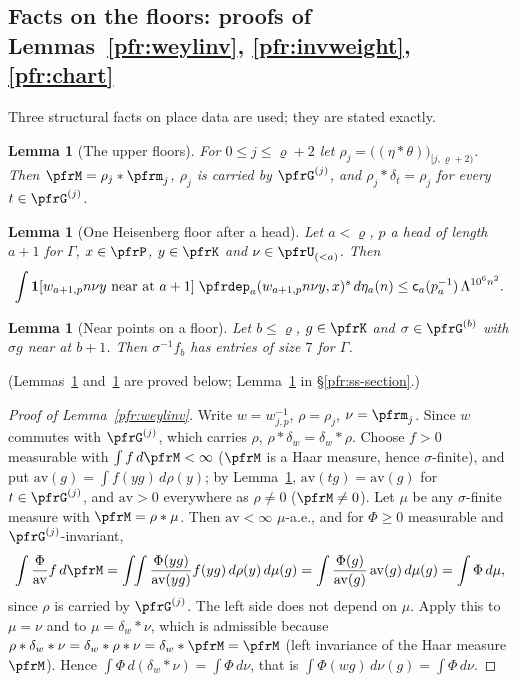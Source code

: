 \documentclass[10pt]{amsart}
\newtheorem{lemma}[theorem]{Lemma}
\theoremstyle{definition}
\theoremstyle{remark}
\begin{document}
\subsection{Facts on the floors: proofs of Lemmas~\ref{pfr:weylinv}, \ref{pfr:invweight}, \ref{pfr:chart}}\label{pfr:ss-floors}

Three structural facts on place data are used; they are stated exactly.

\begin{lemma}[The upper floors]\label{pfr:upperinv}
For $0\le j\le\varrho+2$ let $\rho_j=\bigl((\eta*\theta)\bigr)_{[j,\varrho+2)}$. Then $\pfrM=\rho_j*\pfrm_j$,
$\rho_j$ is carried by $\pfrG^{(j)}$, and $\rho_j*\delta_t=\rho_j$ for every $t\in\pfrG^{(j)}$.
\end{lemma}

\begin{lemma}[One Heisenberg floor after a head]\label{pfr:section}
Let $a<\varrho$, $p$ a head of length $a+1$ for $\Gamma$, $x\in\pfrP$, $y\in\pfrK$ and $\nu\in\pfrU_{(<a)}$. Then
\[
\int\mathbf 1[w_{a+1,p}n\nu y\text{ near at }a+1]\;\pfrdep_a(w_{a+1,p}n\nu y,x)^s\,d\eta_a(n)\le\mathsf c_a(p_a^{-1})
\,\Lambda^{10^6n^2}.
\]
\end{lemma}

\begin{lemma}[Near points on a floor]\label{pfr:nearsize}
Let $b\le\varrho$, $g\in\pfrK$ and $\sigma\in\pfrG^{(b)}$ with $\sigma g$ near at $b+1$. Then $\sigma^{-1}f_b$ has
entries of size $7$ for $\Gamma$.
\end{lemma}
(Lemmas~\ref{pfr:upperinv} and~\ref{pfr:nearsize} are proved below; Lemma~\ref{pfr:section} in \S\ref{pfr:ss-section}.)

\begin{proof}[Proof of Lemma~\ref{pfr:weylinv}]
Write $w=w_{j,p}^{-1}$, $\rho=\rho_j$, $\nu=\pfrm_j$. Since $w$ commutes with $\pfrG^{(j)}$, which carries $\rho$,
$\rho*\delta_w=\delta_w*\rho$. Choose $f>0$ measurable with $\int f\,d\pfrM<\infty$ ($\pfrM$ is a Haar measure,
hence $\sigma$-finite), and put $\mathrm{av}(g)=\int f(yg)\,d\rho(y)$; by Lemma~\ref{pfr:upperinv},
$\mathrm{av}(tg)=\mathrm{av}(g)$ for $t\in\pfrG^{(j)}$, and $\mathrm{av}>0$ everywhere as $\rho\ne0$ ($\pfrM\ne0$).
Let $\mu$ be any $\sigma$-finite measure with $\pfrM=\rho*\mu$. Then $\mathrm{av}<\infty$ $\mu$-a.e., and for
$\Phi\ge0$ measurable and $\pfrG^{(j)}$-invariant,
\[
\int\frac{\Phi}{\mathrm{av}}f\,d\pfrM=\int\!\!\int\frac{\Phi(yg)}{\mathrm{av}(yg)}f(yg)\,d\rho(y)\,d\mu(g)=
\int\frac{\Phi(g)}{\mathrm{av}(g)}\,\mathrm{av}(g)\,d\mu(g)=\int\Phi\,d\mu,
\]
since $\rho$ is carried by $\pfrG^{(j)}$. The left side does not depend on $\mu$. Apply this to $\mu=\nu$ and to
$\mu=\delta_w*\nu$, which is admissible because $\rho*\delta_w*\nu=\delta_w*\rho*\nu=\delta_w*\pfrM=\pfrM$
(left invariance of the Haar measure $\pfrM$). Hence $\int\Phi\,d(\delta_w*\nu)=\int\Phi\,d\nu$, that is
$\int\Phi(wg)\,d\nu(g)=\int\Phi\,d\nu$.
\end{proof}
\end{document}
